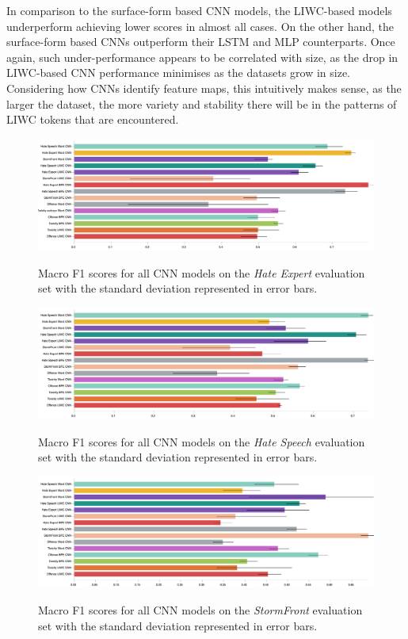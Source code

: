 In comparison to the surface-form based CNN models, the LIWC-based models underperform achieving lower scores in almost all cases. On the other hand, the surface-form based CNNs outperform their LSTM and MLP counterparts. Once again, such under-performance appears to be correlated with size, as the drop in LIWC-based CNN performance minimises as the datasets grow in size.
Considering how CNNs identify feature maps, this intuitively makes sense, as the larger the dataset, the more variety and stability there will be in the patterns of LIWC tokens that are encountered.

\begin{figure}
\begin{minipage}{\textwidth}
\centering
    \includegraphics[width=\textwidth]{all_cnn_waseem_test.pdf}
    \caption{Macro F1 scores for all CNN models on the \textit{Hate Expert} evaluation set with the standard deviation represented in error bars.}
    \label{fig:waseem_cnn_test}
    \vfill
    \includegraphics[width=\textwidth]{all_cnn_waseem_hovy_test.pdf}
    \caption{Macro F1 scores for all CNN models on the \textit{Hate Speech} evaluation set with the standard deviation represented in error bars.}
  \label{fig:waseem_hovy_cnn_test}  
    \includegraphics[width=\textwidth]{all_cnn_garcia_test.pdf}
  \caption{Macro F1 scores for all CNN models on the \textit{StormFront} evaluation set with the standard deviation represented in error bars.}
  \label{fig:garcia_cnn_test}
\end{minipage}
\end{figure}

